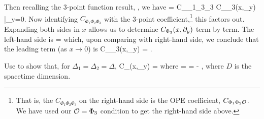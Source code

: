 Then recalling the 3-point function result, , we have
\be 
\label{eqn:Exercise}
     = C_{\Phi_1\Phi_3\Phi_3} C_{\Phi_3}(x,\p_y) \bigg|_{y=0}. 
\ee 
Now identifying $C_{\Phi_1\Phi_2\Phi_3}$ with the 3-point coefficient,\footnote{That is, the $C_{\Phi_1\Phi_2\Phi_3}$ on the right-hand side is the OPE coefficient, $C_{\Phi_1\Phi_2\mathcal{O}}$. We have used our $\mathcal{O}=\Phi_3$ condition to get the right-hand side above.} this factors out. Expanding both sides in $x$ allows us to determine $C_{\Phi_3}(x,\partial_y)$ term by term. The left-hand side is
\bse 
     = 
\ese 
which, upon comparing with right-hand side, we conclude that the leading term (as $x\to 0$) is 
\bse 
    C_{\Delta_3}(x,\p_y) = . 
\ese 

\bbox 
    Use  to show that, for $\Delta_1=\Delta_2=\Delta$,
    \bse 
        C_{\Phi}(x,\p_y) =  
    \ese 
    where 
    \bse 
        \a =  \qand \beta = - ,
    \ese 
    where $D$ is the spacetime dimension. 
\ebox 